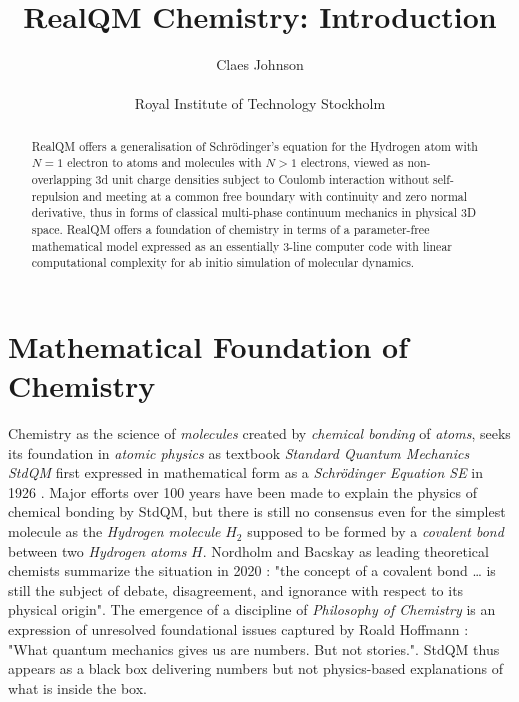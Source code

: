 \documentclass[11pt]{article} %
\title{RealQM Chemistry: Introduction}
\author{Claes Johnson\\
\\
\small{Royal Institute of Technology Stockholm}}
\begin{document}
\maketitle
\begin{abstract} RealQM offers a generalisation of Schr\"odinger's equation for the Hydrogen atom with $N=1$ electron to atoms and molecules with $N>1$ electrons,  viewed as non-overlapping 3d unit charge densities subject to Coulomb interaction without self-repulsion and meeting at a common free boundary with continuity and zero normal derivative,  thus  in forms of classical multi-phase continuum mechanics in physical 3D space.  RealQM offers a foundation of chemistry in terms of a parameter-free mathematical model expressed as an essentially 3-line computer code with linear computational complexity for ab initio simulation of molecular dynamics. 
\end{abstract} 


\section{Mathematical Foundation of Chemistry}
Chemistry as the science of \emph{molecules} created by \emph{chemical bonding} of \emph{atoms},  seeks its foundation in \emph{atomic physics} as textbook \emph{Standard Quantum Mechanics StdQM} first expressed in mathematical form as a \emph{Schr\"odinger Equation SE} in 1926 \cite{piela, primas,koch, scerri1,bader}.  Major efforts over 100 years have been made to explain the physics of chemical bonding by StdQM,  but there is still no consensus even for the simplest molecule as the \emph{Hydrogen molecule} $H_2$ supposed to be formed by a \emph{covalent bond} between two \emph{Hydrogen atoms} $H$.  Nordholm and Bacskay as leading theoretical chemists summarize the situation in 2020 \cite{nordholm}: "the concept of a covalent bond … is still the subject of debate,  disagreement,  and ignorance with respect to its physical origin".  The emergence of a discipline of \emph{Philosophy of Chemistry} \cite{scerri2, philchem} is an expression of unresolved foundational issues captured by Roald Hoffmann \cite{hoffman}: "What quantum mechanics gives us are numbers.  But not stories.".  StdQM thus appears as a black box delivering numbers but not physics-based explanations of what is inside the box.
\end{document}
